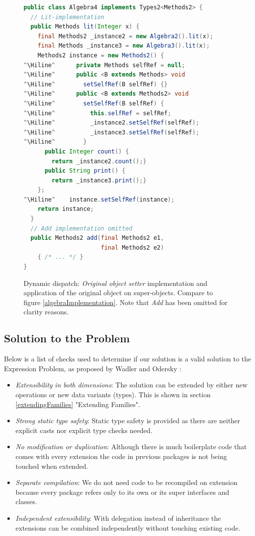 \documentclass{report}
\newcommand{\Hiline}{\makebox[0pt][l]{\color[rgb]{1,0.96,0.98}\rule[-4pt]{\linewidth}{12.5pt}}}
\begin{document}
\begin{figure}[H]
\begin{lstlisting}[language=java]
public class Algebra4 implements Types2<Methods2> {
  // Lit-implementation
  public Methods lit(Integer x) {
    final Methods2 _instance2 = new Algebra2().lit(x);
    final Methods _instance3 = new Algebra3().lit(x);
    Methods2 instance = new Methods2() {
^\Hiline^      private Methods selfRef = null;
^\Hiline^      public <B extends Methods> void
^\Hiline^        setSelfRef(B selfRef) {}
^\Hiline^      public <B extends Methods2> void
^\Hiline^        setSelfRef(B selfRef) {
^\Hiline^          this.selfRef = selfRef;
^\Hiline^          _instance2.setSelfRef(selfRef);
^\Hiline^          _instance3.setSelfRef(selfRef);
^\Hiline^        }
      public Integer count() {
        return _instance2.count();}
      public String print() {
        return _instance3.print();}
    };
^\Hiline^    instance.setSelfRef(instance);
    return instance;
  }
  // Add implementation omitted
  public Methods2 add(final Methods2 e1,
                      final Methods2 e2)
    { /* ... */ }
}
\end{lstlisting}
\caption{Dynamic dispatch: \emph{Original object setter} implementation and application of the original object on super-objects. Compare to figure \ref{algebraImplementation}. Note that \emph{Add} has been omitted for clarity reasons.}
\label{dynamicDispatchAlgebra}
\end{figure}

\subsection{Solution to the Problem}

Below is a list of checks used to determine if our solution is a valid solution to the Expression Problem, as proposed by Wadler and Odersky \cite{Wadler-Expression-1998, Odersky-Expression-2005}:

\begin{itemize}
  \item \emph{Extensibility in both dimensions}: The solution can be extended by either new operations or new data variants (types). This is shown in section \ref{extendingFamilies} "Extending Families".
  \item \emph{Strong static type safety}: Static type safety is provided as there are neither explicit casts nor explicit type checks needed.
  \item \emph{No modification or duplication}: Although there is much boilerplate code that comes with every extension the code in previous packages is not being touched when extended.
  \item \emph{Separate compilation}: We do not need code to be recompiled on extension because every package refers only to its own or its super interfaces and classes.
  \item \emph{Independent extensibility}: With delegation instead of inheritance the extensions can be combined independently without touching existing code.
\end{itemize}
\end{document}
